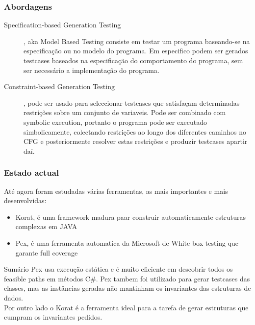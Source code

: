 \documentclass{beamer}
\begin{document}
\begin{frame}\frametitle{Abordagens}
\begin{description}
\item[Specification-based Generation Testing], aka Model Based Testing consiste em testar um programa baseando-se na especificação ou no modelo do programa.
Em especifico podem ser gerados testcases baseados na especificação do comportamento do programa, sem ser necessário a implementação do programa.
\item[Constraint-based Generation Testing], pode ser usado para seleccionar testcases que satisfaçam determinadas restrições sobre um conjunto de variaveis.
Pode ser combinado com symbolic execution, portanto o programa pode ser executado simbolicamente, colectando restrições ao longo dos diferentes caminhos no CFG
e posteriormente resolver estas restrições e produzir testcases apartir daí.
\end{description}
\end{frame}

\begin{frame}\frametitle{Estado actual}
Até agora foram estudadas várias ferramentas, as mais importantes e mais desenvolvidas:
\begin{itemize}
\item Korat, é uma framework madura paar construir automaticamente estruturas complexas em JAVA
\item Pex, é uma ferramenta automatica da Microsoft de White-box testing que garante full coverage
\end{itemize}

\begin{block}{Sumário}
Pex usa execução estática e é muito eficiente em descobrir todos os feasible paths em métodos C\#.
Pex tambem foi utilizado para gerar testcases das classes, mas as instâncias geradas não mantinham os invariantes das estruturas de dados.\\

Por outro lado o Korat é a ferramenta ideal para a tarefa de gerar estruturas que cumpram os invariantes pedidos.
\end{block}
\end{frame}
\end{document}
